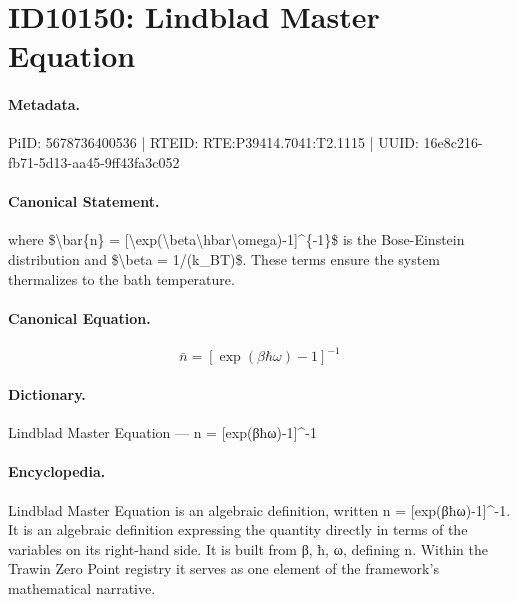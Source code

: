 \section*{ID10150: Lindblad Master Equation}
\paragraph{Metadata.}
PiID: 5678736400536 | RTEID: RTE:P39414.7041:T2.1115 | UUID: 16e8c216-fb71-5d13-aa45-9ff43fa3c052

\paragraph{Canonical Statement.}
where \$\textbackslash{}bar\{n\} = [\textbackslash{}exp(\textbackslash{}beta\textbackslash{}hbar\textbackslash{}omega)-1]\textasciicircum{}\{-1\}\$ is the Bose-Einstein distribution and \$\textbackslash{}beta = 1/(k\_BT)\$. These terms ensure the system thermalizes to the bath temperature.

\paragraph{Canonical Equation.}
\[
\bar{n} = [\exp(\beta\hbar\omega)-1]^{-1}
\]

\paragraph{Dictionary.}
Lindblad Master Equation — n = [exp(βħω)-1]\textasciicircum{}-1

\paragraph{Encyclopedia.}
Lindblad Master Equation is an algebraic definition, written n = [exp(βħω)-1]\textasciicircum{}-1. It is an algebraic definition expressing the quantity directly in terms of the variables on its right-hand side. It is built from β, ħ, ω, defining n. Within the Trawin Zero Point registry it serves as one element of the framework's mathematical narrative.
